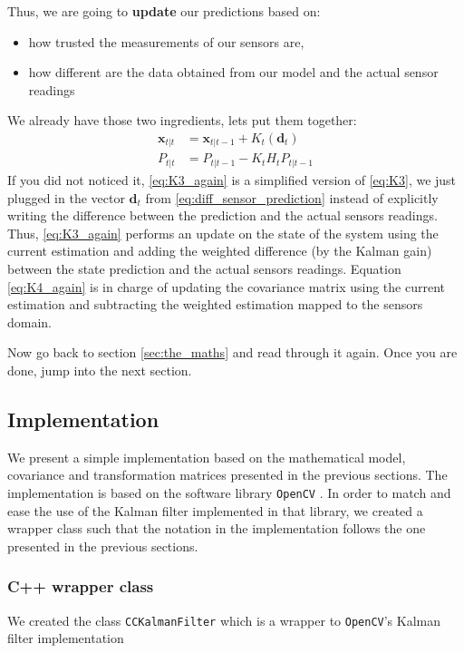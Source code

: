 \documentclass[12pt,a4paper,final]{article} %
\newcommand{\vect}[1]{\mathbf{#1}}
\begin{document}
Thus, we are going to \textbf{update} our predictions based on:
\begin{itemize}
\item how trusted the measurements of our sensors are,
\item how different are the data obtained from our model and the
  actual sensor readings
\end{itemize}
We already have those two ingredients, lets put them together:
\begin{align}
   \vect{x}_{t|t} &= \vect{x}_{t|t-1} + K_t (\vect{d}_t) \label{eq:K3_again}\\
   P_{t|t} &= P_{t|t-1} - K_t H_t P_{t|t-1} \label{eq:K4_again}
\end{align}
If you did not noticed it, \eqref{eq:K3_again} is a simplified version
of \eqref{eq:K3}, we just plugged in the vector $\vect{d}_t$ from
\eqref{eq:diff_sensor_prediction} instead of explicitly writing the
difference between the prediction and the actual sensors
readings. Thus, \eqref{eq:K3_again} performs an update on the state of
the system using the current estimation and adding the weighted
difference (by the Kalman gain) between the state prediction and the
actual sensors readings. Equation \ref{eq:K4_again} is in charge of
updating the covariance matrix using the current estimation and
subtracting the weighted estimation mapped to the sensors domain.

Now go back to section \ref{sec:the_maths} and read through it
again. Once you are done, jump into the next section.

\subsection{Implementation}
We present a simple implementation based on the mathematical model,
covariance and transformation matrices presented in the previous
sections. The implementation is based on the software library
\texttt{OpenCV} \cite{opencv:2000:ARTICLE}. In order to match and ease
the use of the Kalman filter implemented in that library, we created a
wrapper class such that the notation in the implementation follows the
one presented in the previous sections.

\subsubsection{C++ wrapper class}
We created the class \texttt{CCKalmanFilter} which is a wrapper to
\texttt{OpenCV}'s Kalman filter implementation
\end{document}
